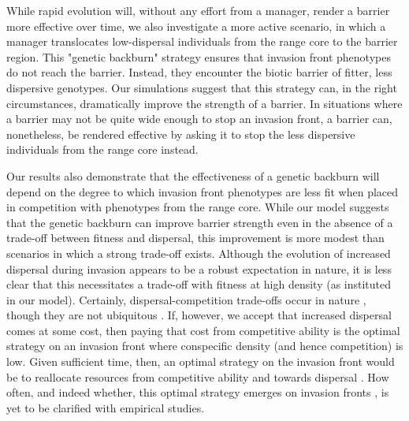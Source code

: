 \documentclass{article}
\begin{document}
While rapid evolution will, without any effort from a manager, render a barrier more effective over time, we also investigate a more active scenario, in which a manager translocates low-dispersal individuals from the range core to the barrier region.  This "genetic backburn" strategy ensures that invasion front phenotypes do not reach the barrier.  Instead, they encounter the biotic barrier of fitter, less dispersive genotypes.  Our simulations suggest that this strategy can, in the right circumstances, dramatically improve the strength of a barrier.  In situations where a barrier may not be quite wide enough to stop an invasion front, a barrier can, nonetheless, be rendered effective by asking it to stop the less dispersive individuals from the range core instead.    

Our results also demonstrate that the effectiveness of a genetic backburn will depend on the degree to which invasion front phenotypes are less fit when placed in competition with phenotypes from the range core.  While our model suggests that the genetic backburn can improve barrier strength even in the absence of a trade-off between fitness and dispersal, this improvement is more modest than scenarios in which a strong trade-off exists.  Although the evolution of increased dispersal during invasion appears to be a robust expectation in nature, it is less clear that this necessitates a trade-off with fitness at high density (as instituted in our model).  Certainly, dispersal-competition trade-offs occur in nature \citep[e.g.,][]{Jakobsson_2003, Cadotte_2006}, though they are not ubiquitous \citep[e.g.,][]{Limberger_2011}.  If, however, we accept that increased dispersal comes at some cost, then paying that cost from competitive ability is the optimal strategy on an invasion front where conspecific density (and hence competition) is low.  Given sufficient time, then, an optimal strategy on the invasion front would be to reallocate resources from competitive ability and towards dispersal \citep{Burton_Travis_Phillips_2010}.  How often, and indeed whether, this optimal strategy emerges on invasion fronts \citep[where stochastic forces often lead to non-optimal phenotypes dominating:][]{Peischl_2015, Peischl_Dupanloup_Kirkpatrick_Excoffier_2013, Phillips_2015}, is yet to be clarified with empirical studies.
\end{document}
